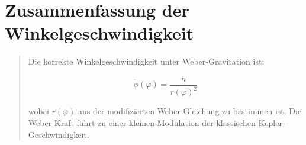 \section{Zusammenfassung der Winkelgeschwindigkeit}

\begin{quote}
Die korrekte Winkelgeschwindigkeit unter Weber-Gravitation ist:

\begin{equation}
\boxed{\dot{\phi}(\varphi) = \frac{h}{r(\varphi)^2}}
\end{equation}

wobei \( r(\varphi) \) aus der modifizierten Weber-Gleichung zu bestimmen ist. Die Weber-Kraft führt zu einer kleinen Modulation der klassischen Kepler-Geschwindigkeit.
\end{quote}
